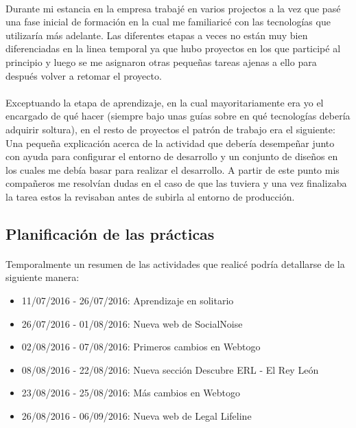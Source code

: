 \documentclass[10pt, a4paper,spanish]{article}
\begin{document}
            \paragraph{}
            Durante mi estancia en la empresa trabajé en varios projectos a la vez que pasé una fase inicial de formación en la cual me familiaricé con las tecnologías que utilizaría más adelante. Las diferentes etapas a veces no están muy bien diferenciadas en la linea temporal ya que hubo proyectos en los que participé al principio y luego se me asignaron otras pequeñas tareas ajenas a ello para después volver a retomar el proyecto.

            \paragraph{}
            Exceptuando la etapa de aprendizaje, en la cual mayoritariamente era yo el encargado de qué hacer (siempre bajo unas guías sobre en qué tecnologías debería adquirir soltura), en el resto de proyectos el patrón de trabajo era el siguiente: Una pequeña explicación acerca de la actividad que debería desempeñar junto con ayuda para configurar el entorno de desarrollo y un conjunto de diseños en los cuales me debía basar para realizar el desarrollo. A partir de este punto mis compañeros me resolvían dudas en el caso de que las tuviera y una vez finalizaba la tarea estos la revisaban antes de subirla al entorno de producción.


        \subsection{Planificación de las prácticas}

            \paragraph{}
            Temporalmente un resumen de las actividades que realicé podría detallarse de la siguiente manera:

            \begin{itemize}
                \item 11/07/2016 - 26/07/2016:  Aprendizaje en solitario
                \item 26/07/2016 - 01/08/2016:  Nueva web de SocialNoise
                \item 02/08/2016 - 07/08/2016:  Primeros cambios en Webtogo
                \item 08/08/2016 - 22/08/2016:  Nueva sección Descubre ERL - El Rey León
                \item 23/08/2016 - 25/08/2016:  Más cambios en Webtogo
                \item 26/08/2016 - 06/09/2016:  Nueva web de Legal Lifeline
            \end{itemize}
\end{document}
